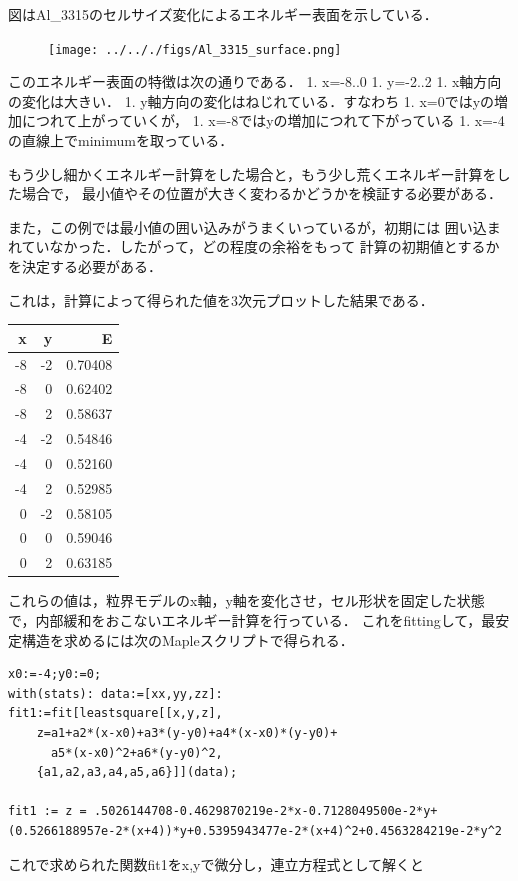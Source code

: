     図はAl\_3315のセルサイズ変化によるエネルギー表面を示している．

\begin{figure}[H]
\centering
\begin{center}
\texttt{[image: ../.././figs/Al\_3315\_surface.png]}
\end{center}
\caption{{}}

\label{fig:}
\end{figure}

    このエネルギー表面の特徴は次の通りである． 1. x=-8..0 1. y=-2..2 1.
x軸方向の変化は大きい． 1. y軸方向の変化はねじれている．すなわち 1.
x=0ではyの増加につれて上がっていくが， 1.
x=-8ではyの増加につれて下がっている 1.
x=-4の直線上でminimumを取っている．

もう少し細かくエネルギー計算をした場合と，もう少し荒くエネルギー計算をした場合で，
最小値やその位置が大きく変わるかどうかを検証する必要がある．

また，この例では最小値の囲い込みがうまくいっているが，初期には
囲い込まれていなかった．したがって，どの程度の余裕をもって
計算の初期値とするかを決定する必要がある．

    これは，計算によって得られた値を3次元プロットした結果である．

\begin{longtable}[]{@{}rrr@{}}
\toprule
x & y & E\tabularnewline
\midrule
\endhead
-8 & -2 & 0.70408\tabularnewline
-8 & 0 & 0.62402\tabularnewline
-8 & 2 & 0.58637\tabularnewline
-4 & -2 & 0.54846\tabularnewline
-4 & 0 & 0.52160\tabularnewline
-4 & 2 & 0.52985\tabularnewline
0 & -2 & 0.58105\tabularnewline
0 & 0 & 0.59046\tabularnewline
0 & 2 & 0.63185\tabularnewline
\bottomrule
\end{longtable}

これらの値は，粒界モデルのx軸，y軸を変化させ，セル形状を固定した状態で，内部緩和をおこないエネルギー計算を行っている．
これをfittingして，最安定構造を求めるには次のMapleスクリプトで得られる．

\begin{verbatim}
x0:=-4;y0:=0;
with(stats): data:=[xx,yy,zz]: 
fit1:=fit[leastsquare[[x,y,z], 
    z=a1+a2*(x-x0)+a3*(y-y0)+a4*(x-x0)*(y-y0)+
      a5*(x-x0)^2+a6*(y-y0)^2, 
    {a1,a2,a3,a4,a5,a6}]](data);

fit1 := z = .5026144708-0.4629870219e-2*x-0.7128049500e-2*y+
(0.5266188957e-2*(x+4))*y+0.5395943477e-2*(x+4)^2+0.4563284219e-2*y^2
\end{verbatim}

これで求められた関数fit1をx,yで微分し，連立方程式として解くと

